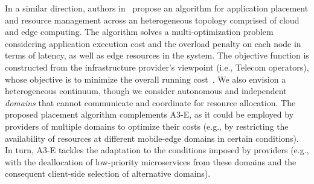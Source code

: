 

In a similar direction, authors in~\cite{Tarneberg2017} propose an algorithm for application placement and resource management across an heterogeneous topology comprised of cloud and edge computing. 
The algorithm solves a multi-optimization problem considering application
execution cost and the overload penalty on each node in terms of latency, as well as edge resources in the system. The objective function is constructed from the infrastructure provider's viewpoint (i.e., Telecom operators), whose objective is to minimize the overall running cost~\cite{weber2017facilitating}. We also envision a heterogeneous continuum, though we consider autonomous and independent \textit{domains} that cannot communicate and coordinate for resource allocation. The proposed placement algorithm complements A3-E, as it could be employed by providers of multiple domains to optimize their costs (e.g., by restricting the availability of resources at different mobile-edge domains in certain conditions). In turn, A3-E tackles the adaptation to the conditions imposed by providers (e.g., with the deallocation of low-priority microservices from these domains and the consequent client-side selection of alternative domains).

